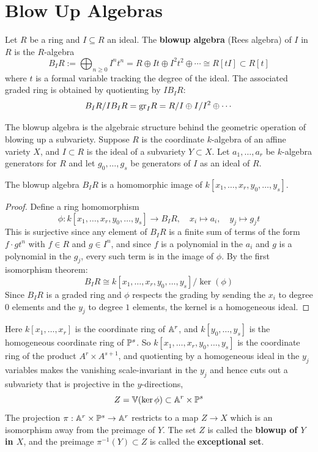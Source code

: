 \documentclass[12pt]{amsproc}
\begin{document}

\section{Blow Up Algebras}\label{blowup}


\begin{definition}
    Let $R$ be a ring and $I \subseteq R$ an ideal. The \textbf{blowup algebra} (Rees algebra) of $I$ in $R$ is the $R$-algebra
    \[B_I R:= \bigoplus_{n \geq 0} I^n t^n = R \oplus It \oplus I^2t^2 
    \oplus \cdots \cong R[tI] \subset R[t]\]
    where $t$ is a formal variable tracking the degree of the ideal. The 
    associated graded ring is obtained by quotienting by $IB_IR$:
    \[B_I R/ I B_I R = \gr_I R = R/I \oplus I/I^2 \oplus \cdots \]
\end{definition}

    The blowup algebra is the algebraic structure behind the geometric operation 
    of blowing up a subvariety. Suppose $R$ is the coordinate $k$-algebra of an affine variety $X$, and $I \subset R$ is the ideal of a subvariety $Y \subset X$. Let $a_1, \ldots, a_r$ be $k$-algebra generators for $R$ and let $g_0, \ldots, g_s$ be generators of $I$ as an ideal of $R$. 
    \begin{proposition}\label{blowimage}
        The blowup algebra $B_I R$ is a homomorphic image of 
        $k[x_1, \ldots, x_r, y_0, \ldots, y_s]$.
    \end{proposition}

    \begin{proof}
        Define a ring homomorphism 
        \[\phi: k[x_1, \ldots, x_r, y_0, \ldots, y_s] \to B_I R, 
        \quad x_i \mapsto a_i, \quad y_j \mapsto g_j t\]
        This is surjective since any element of $B_I R$ is a finite sum of terms of the form $f \cdot g t^n$ with $f \in R$ and $g \in I^n$, and since $f$ is a polynomial in the $a_i$ and $g$ is a polynomial in the $g_j$, every such term is in the image of $\phi$. By the first isomorphism theorem:
        \[B_I R \cong k[x_1, \ldots, x_r, y_0, \ldots, y_s] / \ker(\phi)\]
        Since $B_IR$ is a graded ring and $\phi$ respects the grading by sending the $x_i$ to degree $0$ elements and the $y_j$ to degree $1$ elements, the kernel is a homogeneous ideal.
    \end{proof}

    Here $k[x_1,\ldots,x_r]$ is the coordinate ring of $\A^r$, and $k[y_0, \ldots, y_s]$ is the homogeneous coordinate ring of $\P^s$. So $k[x_1, \ldots, x_r, y_0, \ldots, y_s]$ is the coordinate ring of the product $A^r \times A^{s+1}$, and quotienting by a homogeneous ideal in the $y_j$ variables makes the vanishing scale-invariant in the $y_j$ and hence cuts out a subvariety that is projective in the $y$-directions, 
    \[Z = \V(\ker \phi) \subset \A^r \times \P^s\]
    The projection $\pi: \A^r \times \P^s \to \A^r$ restricts to a map $Z \to X$ which is an isomorphism away from the preimage of $Y$. The set $Z$ is called the \textbf{blowup of $Y$ in $X$}, and the preimage $\pi^{-1}(Y) \subset Z$ is called the \textbf{exceptional set}. 
    
\end{document}
